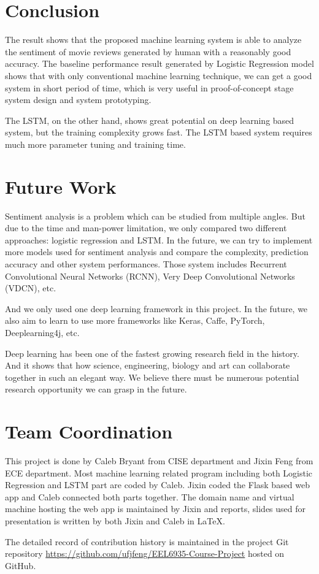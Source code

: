 \documentclass[conference]{IEEEtran}
\begin{document}
\section{Conclusion}
\label{conclusion}
    The result shows that the proposed machine learning system is able to 
    analyze the sentiment of movie reviews generated by human with a reasonably
    good accuracy. The baseline performance result generated by Logistic Regression
    model shows that with only conventional machine learning technique, we can 
    get a good system in short period of time, which is very useful in 
    proof-of-concept stage system design and system prototyping.
    
    The LSTM, on the other hand, shows great potential on deep learning based
    system, but the training complexity grows fast. The LSTM based system requires
    much more parameter tuning and training time. 
    
\section{Future Work}
\label{future}
    Sentiment analysis is a problem which can be studied from multiple angles. But due 
    to the time and man-power limitation, we only compared two different approaches:
    logistic regression and LSTM. In the future, we can try to implement more models used
    for sentiment analysis and compare the complexity, prediction accuracy and other
    system performances. Those system includes Recurrent Convolutional
    Neural Networks (RCNN)\cite{lai2015recurrent}, Very Deep Convolutional Networks 
    (VDCN)\cite{conneau2017very}, etc.
    
    And we only used one deep learning framework in this project. In the future, we
    also aim to learn to use more frameworks like Keras\cite{chollet2015keras},
    Caffe\cite{jia2014caffe}, PyTorch\cite{paszke2017automatic}, 
    Deeplearning4j\cite{nicholson2017deeplearning4j}, etc.
    
    Deep learning has been one of the fastest growing research field in the history.
    And it shows that how science, engineering, biology and art can collaborate together
    in such an elegant way. We believe there must be numerous potential research opportunity
    we can grasp in the future.


\section{Team Coordination}
\label{team}
    This project is done by Caleb Bryant from CISE department and Jixin Feng from ECE 
    department. Most machine learning related program including both Logistic 
    Regression and LSTM part are coded by Caleb. Jixin coded the Flask based web app
    and Caleb connected both parts together. The domain name and virtual machine hosting
    the web app is maintained by Jixin and reports, slides used for presentation
    is written by both Jixin and Caleb in \LaTeX.
    
    The detailed record of contribution history is maintained in the project Git repository
    \url{https://github.com/ufjfeng/EEL6935-Course-Project} hosted on GitHub.




\end{document}
